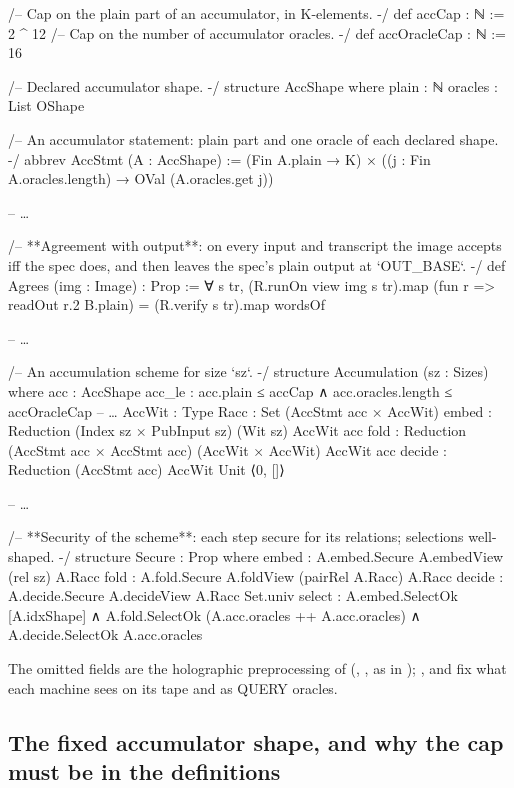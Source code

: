 \begin{leancode}[fontsize=\footnotesize,label={\footnotesize Contract/Accumulation.lean (abridged)}]
/-- Cap on the plain part of an accumulator, in K-elements. -/
def accCap : ℕ := 2 ^ 12
/-- Cap on the number of accumulator oracles. -/
def accOracleCap : ℕ := 16

/-- Declared accumulator shape. -/
structure AccShape where
  plain : ℕ
  oracles : List OShape

/-- An accumulator statement: plain part and one oracle of each declared shape. -/
abbrev AccStmt (A : AccShape) := (Fin A.plain → K) ×
    ((j : Fin A.oracles.length) → OVal (A.oracles.get j))

-- …

/-- **Agreement with output**: on every input and transcript the image accepts iff the spec
does, and then leaves the spec's plain output at `OUT_BASE`. -/
def Agrees (img : Image) : Prop :=
  ∀ s tr, (R.runOn view img s tr).map (fun r => readOut r.2 B.plain) =
    (R.verify s tr).map wordsOf

-- …

/-- An accumulation scheme for size `sz`. -/
structure Accumulation (sz : Sizes) where
  acc : AccShape
  acc_le : acc.plain ≤ accCap ∧ acc.oracles.length ≤ accOracleCap
  -- …
  AccWit : Type
  Racc : Set (AccStmt acc × AccWit)
  embed : Reduction (Index sz × PubInput sz) (Wit sz) AccWit acc
  fold : Reduction (AccStmt acc × AccStmt acc) (AccWit × AccWit) AccWit acc
  decide : Reduction (AccStmt acc) AccWit Unit ⟨0, []⟩

-- …

/-- **Security of the scheme**: each step secure for its relations; selections well-shaped. -/
structure Secure : Prop where
  embed : A.embed.Secure A.embedView (rel sz) A.Racc
  fold : A.fold.Secure A.foldView (pairRel A.Racc) A.Racc
  decide : A.decide.Secure A.decideView A.Racc Set.univ
  select : A.embed.SelectOk [A.idxShape] ∧ A.fold.SelectOk (A.acc.oracles ++ A.acc.oracles) ∧
    A.decide.SelectOk A.acc.oracles
\end{leancode}
\noindent The omitted fields are the holographic preprocessing of  (,
, as in ); ,  and  fix
what each machine sees on its tape and as QUERY oracles.

\subsection{The fixed accumulator shape, and why the cap must be in the definitions}\label{subsec:rec-shape}

